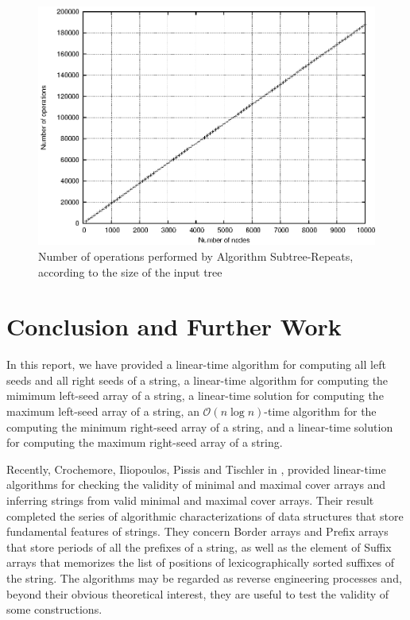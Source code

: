 \documentclass[preprint,12pt]{elsarticle}
\newcommand{\cO}{\ensuremath{\mathcal{O}}}
\begin{document}
\begin{figure}[!t]\centering
 \includegraphics[width=12cm]{experiment.eps}

 \caption{Number of operations performed by Algorithm {\sc Subtree-Repeats}, according to the size of the input tree}
\label{fig:exp}
\end{figure}



\section{Conclusion and Further Work}\label{sec:conclusion}

In this report, we have provided 
a linear-time algorithm for computing all left seeds and all right seeds of a string, 
a linear-time algorithm for computing the mimimum left-seed array of a string, 
a linear-time solution for computing the maximum left-seed array of a string,
an $\cO(n\log n)$-time algorithm for the computing the minimum right-seed array of a string, 
and a linear-time solution for computing the maximum right-seed array of a string. 

Recently, Crochemore, Iliopoulos, Pissis and Tischler in \cite{CIPT10},
provided linear-time algorithms for checking the validity of minimal and maximal cover arrays
and inferring strings from valid minimal and maximal cover arrays.
Their result completed the series of algorithmic characterizations
of data structures that store fundamental features of strings.
They concern Border arrays \cite{DLL05jalc,FGLRSSY02} and Prefix arrays \cite{CCR09-pref}
that store periods of all the prefixes of a string, as well as the element
of Suffix arrays \cite{BannaiIST03,FS06} that memorizes the list of positions
of lexicographically sorted suffixes of the string.
The algorithms may be regarded as reverse engineering processes and, beyond their
obvious theoretical interest, they are useful to test the validity of some
constructions.
\end{document}
